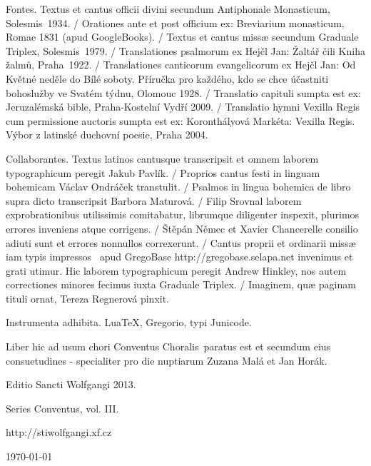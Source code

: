 \documentclass[a4paper, twoside, 12pt]{article}
\newcommand{\annusEditionis}{2013}
\begin{document}
Fontes. 
Textus et cantus officii divini secundum Antiphonale Monasticum, Solesmis~1934. /
Orationes ante et post officium ex: 
Breviarium monasticum, Romae 1831 (apud GoogleBooks). /
Textus et cantus missæ secundum Graduale Triplex, Solesmis~1979. /
Translationes psalmorum ex Hejčl Jan: Žaltář čili Kniha žalmů, Praha~1922. /
Translationes canticorum evangelicorum ex Hejčl Jan: 
Od Květné neděle do Bílé soboty. Příručka pro každého, kdo se chce účastniti
bohoslužby ve Svatém týdnu, Olomouc 1928. /
Translatio capituli sumpta est ex: 
Jeruzalémská bible, Praha-Kostelní Vydří 2009. /
Translatio hymni Vexilla Regis cum permissione auctoris sumpta est ex:
Koronthályová Markéta: Vexilla Regis. Výbor z latinské duchovní poesie,
Praha 2004. 

Collaborantes.
Textus latinos cantusque transcripsit et omnem laborem typographicum peregit
Jakub Pavlík. /
Proprios cantus festi in linguam bohemicam Václav Ondráček transtulit. /
Psalmos in lingua bohemica de libro supra dicto transcripsit
Barbora Maturová. /
Filip Srovnal laborem exprobrationibus utilissimis comitabatur,
librumque diligenter inspexit, plurimos errores inveniens atque corrigens. /
Štěpán Němec et Xavier Chancerelle consilio adiuti sunt et errores
nonnullos correxerunt. /
Cantus proprii et ordinarii missæ 
iam \guillemotright typis impressos\guillemotleft\mbox{ }
apud GregoBase
http://gregobase.selapa.net invenimus et grati utimur. Hic laborem typographicum
peregit Andrew Hinkley, nos autem correctiones minores fecimus
iuxta Graduale Triplex. /
Imaginem, quæ paginam tituli ornat, Tereza Regnerová pinxit.

Instrumenta adhibita.
LuaTeX, %
Gregorio, %
typi Junicode. %

\begin{center}
Liber hic ad usum chori 
\guillemotright Conventus Choralis\guillemotleft\ 
paratus est
et secundum eius consuetudines -
specialiter pro die nuptiarum Zuzana Malá et Jan Horák.

\vspace{1cm}

{\large Editio Sancti Wolfgangi \annusEditionis .}

\vspace{2mm}

Series \guillemotright Conventus\guillemotleft, vol. III.

\vspace{1cm}

http://stiwolfgangi.xf.cz
\vfill

\today

\end{center}
\end{document}
